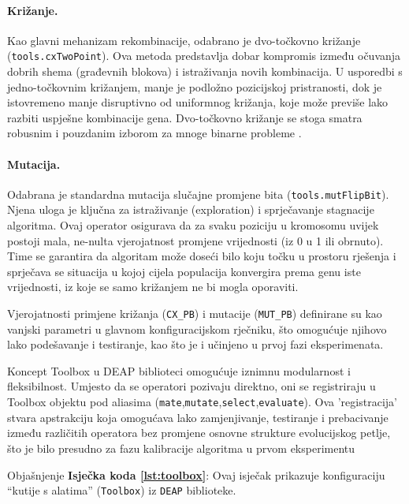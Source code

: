 \paragraph{Križanje.}
Kao glavni mehanizam rekombinacije, odabrano je dvo-točkovno križanje (\texttt{tools.cxTwoPoint}). Ova metoda predstavlja dobar kompromis između očuvanja dobrih shema (građevnih blokova) i istraživanja novih kombinacija. U usporedbi s jedno-točkovnim križanjem, manje je podložno pozicijskoj pristranosti, dok je istovremeno manje disruptivno od uniformnog križanja, koje može previše lako razbiti uspješne kombinacije gena. Dvo-točkovno križanje se stoga smatra robusnim i pouzdanim izborom za mnoge binarne probleme \cite{Mitchell1998}.

\paragraph{Mutacija.}
Odabrana je standardna mutacija slučajne promjene bita (\texttt{tools.mutFlipBit}). Njena uloga je ključna za istraživanje (exploration) i sprječavanje stagnacije algoritma. Ovaj operator osigurava da za svaku poziciju u kromosomu uvijek postoji mala, ne-nulta vjerojatnost promjene vrijednosti (iz 0 u 1 ili obrnuto). Time se garantira da algoritam može doseći bilo koju točku u prostoru rješenja i sprječava se situacija u kojoj cijela populacija konvergira prema genu iste vrijednosti, iz koje se samo križanjem ne bi mogla oporaviti.

Vjerojatnosti primjene križanja (\texttt{CX\_PB}) i mutacije (\texttt{MUT\_PB}) definirane su kao vanjski parametri u glavnom konfiguracijskom rječniku, što omogućuje njihovo lako podešavanje i testiranje, kao što je i učinjeno u prvoj fazi eksperimenata.

Koncept Toolbox u DEAP biblioteci omogućuje iznimnu modularnost i fleksibilnost. Umjesto da se operatori pozivaju direktno, oni se registriraju u Toolbox objektu pod aliasima (\texttt{mate},\texttt{mutate},\texttt{select},\texttt{evaluate}). Ova 'registracija' stvara apstrakciju koja omogućava lako zamjenjivanje, testiranje i prebacivanje između različitih operatora bez promjene osnovne strukture evolucijskog petlje, što je bilo presudno za fazu kalibracije algoritma u prvom eksperimentu

Objašnjenje \textbf{Isječka koda \ref{lst:toolbox}}:
Ovaj isječak prikazuje konfiguraciju ``kutije s alatima'' (\texttt{Toolbox}) iz \texttt{DEAP} biblioteke.

